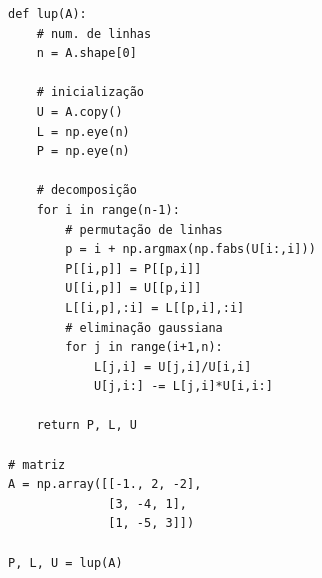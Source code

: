 \begin{ex}
\begin{lstlisting}[caption=lup.py, label=cap_sislin_sec_lu:cod:lup]
def lup(A):
    # num. de linhas
    n = A.shape[0]

    # inicialização
    U = A.copy()
    L = np.eye(n)
    P = np.eye(n)

    # decomposição
    for i in range(n-1):
        # permutação de linhas
        p = i + np.argmax(np.fabs(U[i:,i]))
        P[[i,p]] = P[[p,i]]
        U[[i,p]] = U[[p,i]]
        L[[i,p],:i] = L[[p,i],:i]
        # eliminação gaussiana
        for j in range(i+1,n):
            L[j,i] = U[j,i]/U[i,i]
            U[j,i:] -= L[j,i]*U[i,i:]

    return P, L, U

# matriz
A = np.array([[-1., 2, -2],
              [3, -4, 1],
              [1, -5, 3]])

P, L, U = lup(A)
\end{lstlisting}
\end{ex}

